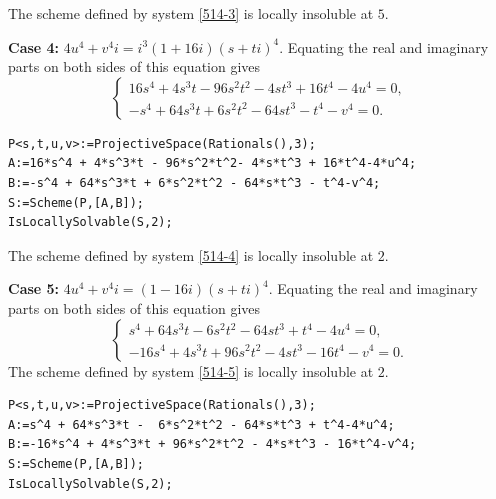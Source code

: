 \documentclass[a4paper,12pt,english,reqno]{amsart}
\begin{document}
The scheme defined by system \eqref{514-3} is locally insoluble at $5$.

{\bf Case 4:} $4u^4+v^4i=i^3(1+16i)(s+ti)^4$. Equating the real and imaginary parts on both sides of this equation gives
\begin{equation}\label{514-4}
\begin{cases}
16s^4 + 4s^3t - 96s^2t^2- 4st^3 + 16t^4-4u^4=0,\\
-s^4 + 64s^3t + 6s^2t^2 - 64st^3 - t^4-v^4=0.
\end{cases}
\end{equation}


\begin{lstlisting}
P<s,t,u,v>:=ProjectiveSpace(Rationals(),3);
A:=16*s^4 + 4*s^3*t - 96*s^2*t^2- 4*s*t^3 + 16*t^4-4*u^4;
B:=-s^4 + 64*s^3*t + 6*s^2*t^2 - 64*s*t^3 - t^4-v^4;
S:=Scheme(P,[A,B]);
IsLocallySolvable(S,2);
\end{lstlisting}

The scheme defined by system \eqref{514-4} is locally insoluble at $2$.


{\bf Case 5:} $4u^4+v^4i=(1-16i)(s+ti)^4$. Equating the real and imaginary parts on both sides of this equation gives
\begin{equation}\label{514-5}
\begin{cases}
s^4 + 64s^3t -  6s^2t^2 - 64st^3 + t^4-4u^4=0,\\
-16s^4 + 4s^3t + 96s^2t^2 - 4st^3 - 16t^4-v^4=0.
\end{cases}
\end{equation}
The scheme defined by system \eqref{514-5} is locally insoluble at $2$.

\begin{lstlisting}
P<s,t,u,v>:=ProjectiveSpace(Rationals(),3);
A:=s^4 + 64*s^3*t -  6*s^2*t^2 - 64*s*t^3 + t^4-4*u^4;
B:=-16*s^4 + 4*s^3*t + 96*s^2*t^2 - 4*s*t^3 - 16*t^4-v^4;
S:=Scheme(P,[A,B]);
IsLocallySolvable(S,2);
\end{lstlisting}
\end{document}
